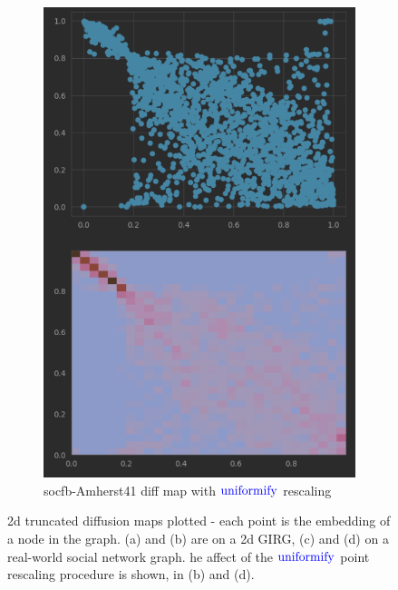 \begin{figure}
\begin{subfigure}{0.45\textwidth}
      \includegraphics[width=\linewidth]{figures/real_diffmap_plot_uniformed.png}
      \caption{socfb-Amherst41 diff map with $\operatorname{\textcolor{blue}{uniformify}}$ rescaling}
      \label{fig:sub4}
    \end{subfigure}
    \caption{
      2d truncated diffusion maps plotted - each point is the embedding of a node in the graph. (a) and (b) are on a 2d GIRG, (c) and (d) on a real-world social network graph. he affect of the $\operatorname{\textcolor{blue}{uniformify}}$ point rescaling procedure is shown, in (b) and (d).}
    \label{fig:diffmap_uniformed_vs_nonuniformed}
\end{figure}




